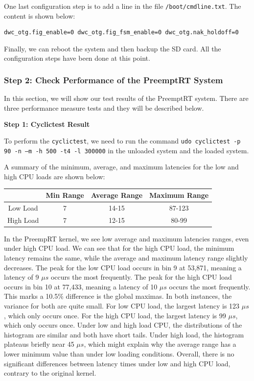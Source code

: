 \documentclass[a4paper,10pt]{article}
\newcommand{\code}[1]{\colorbox{light-gray}{\texttt{#1}}}
\begin{document}
One last configuration step is to add a line in the file \code{/boot/cmdline.txt}. The content is shown below:
\begin{center}
\begin{lstlisting}[language=bash, label=code:code15] 
dwc_otg.fig_enable=0 dwc_otg.fig_fsm_enable=0 dwc_otg.nak_holdoff=0
\end{lstlisting}
\end{center}\vspace{-1em}

Finally, we can reboot the system and then backup the SD card. All the configuration steps have been done at this point.

\subsubsection{Step 2: Check Performance of the PreemptRT System}
In this section, we will show our test results of the PreemptRT system. There are three performance measure tests and they will be described below.

\textbf{Step 1: Cyclictest Result}

To perform the \code{cyclictest}, we need to run the command \code{udo cyclictest -p 90 -n –m -h 500 -t4 -l 300000} in the unloaded system and the loaded system.

A summary of the minimum, average, and maximum latencies for the low and high CPU loads are shown below:

\begin{center}
\begin{tabular}{||c c c c||} 
 \hline
  & Min Range & Average Range & Maximum Range \\ [0.5ex] 
 \hline\hline
 Low Load & 7 & 14-15 & 87-123 \\ 
 \hline
 High Load & 7 & 12-15 & 80-99 \\ [1ex] 
 \hline
\end{tabular}
\end{center}

In the PreempRT kernel, we see low average and maximum latencies ranges, even under high CPU load.
We can see that for the high CPU load, the minimum latency remains the same, while the average and maximum latency range slightly decreases. The peak for the low CPU load occurs in bin 9 at 53,871, meaning a latency of 9 $\mu s$ occurs the most frequently. The peak for the high CPU load occurs in bin 10 at 77,433, meaning a latency of 10 $\mu s$ occurs the most frequently. This marks a 10.5\% difference is the global maximas. In both instances, the variance for both are quite small. For low CPU load, the largest latency is 123 $\mu s$, which only occurs once. For the high CPU load, the largest latency is 99 $\mu s$, which only occurs once.  Under low and high load CPU, the distributions of the histogram are similar and both have short tails. Under high load, the histogram plateaus briefly near 45 $\mu s$, which might explain why the average range has a lower minimum value than under low loading conditions. Overall, there is no significant differences between latency times under low and high CPU load, contrary to the original kernel. 
\end{document}
